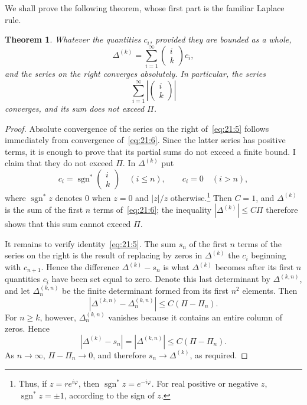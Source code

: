 \documentclass[
  paper=b5,
  fontsize=13pt,
  twoside=true,
  open=any,
  bookmarkpackage=false,
  chapterprefix=true,
  headings=normal
]{scrbook}
\newtheorem*{theorem}{Theorem}
\theoremstyle{definition}
\begin{document}
We shall prove the following theorem, whose first part is the familiar Laplace rule.

\begin{theorem}
Whatever the quantities $c_i$, provided they are bounded as a whole,
\begin{equation}
  \Delta^{(k)}=\sum_{i=1}^{\infty}
  \left(\begin{matrix}i\\k\end{matrix}\right)c_i,
  \tag{5}\label{eq:21:5}
\end{equation}
and the series on the right converges absolutely. In particular, the series
\begin{equation}
  \sum_{i=1}^{\infty}
  \left|\left(\begin{matrix}i\\k\end{matrix}\right)\right|
  \tag{6}\label{eq:21:6}
\end{equation}
converges, and its sum does not exceed $\Pi$.
\end{theorem}

\begin{proof}
Absolute convergence of the series on the right of~\eqref{eq:21:5} follows immediately from convergence of~\eqref{eq:21:6}. Since the latter series has positive terms, it is enough to prove that its partial sums do not exceed a finite bound. I claim that they do not exceed $\Pi$. In $\Delta^{(k)}$ put
\[
 c_i=\operatorname{sgn}^{*}\!\left(\begin{matrix}i\\k\end{matrix}\right)
 \quad(i\leq n),\qquad c_i=0\quad(i>n),
\]
where $\operatorname{sgn}^{*}z$ denotes $0$ when $z=0$ and $|z|/z$ otherwise.\footnote{Thus, if $z=re^{i\varphi}$, then $\operatorname{sgn}^{*}z=e^{-i\varphi}$. For real positive or negative $z$, $\operatorname{sgn}^{*}z=\pm1$, according to the sign of $z$.} Then $C=1$, and $\Delta^{(k)}$ is the sum of the first $n$ terms of~\eqref{eq:21:6}; the inequality $|\Delta^{(k)}|\leq C\Pi$ therefore shows that this sum cannot exceed $\Pi$.

It remains to verify identity~\eqref{eq:21:5}. The sum $s_n$ of the
first $n$ terms of the series on the right is the result of replacing by zeros in $\Delta^{(k)}$ the $c_i$ beginning with $c_{n+1}$. Hence the difference $\Delta^{(k)}-s_n$ is what $\Delta^{(k)}$ becomes after its first $n$ quantities $c_i$ have been set equal to zero. Denote this last determinant by $\Delta^{(k,n)}$, and let $\Delta_n^{(k,n)}$ be the finite determinant formed from its first $n^2$ elements. Then
\[
  |\Delta^{(k,n)}-\Delta_n^{(k,n)}|\leq C(\Pi-\Pi_n).
\]
For $n\geq k$, however, $\Delta_n^{(k,n)}$ vanishes because it contains an entire column of zeros. Hence
\[
 |\Delta^{(k)}-s_n|=|\Delta^{(k,n)}|\leq C(\Pi-\Pi_n).
\]
As $n\to\infty$, $\Pi-\Pi_n\to0$, and therefore $s_n\to\Delta^{(k)}$, as required.
\end{proof}
\end{document}
